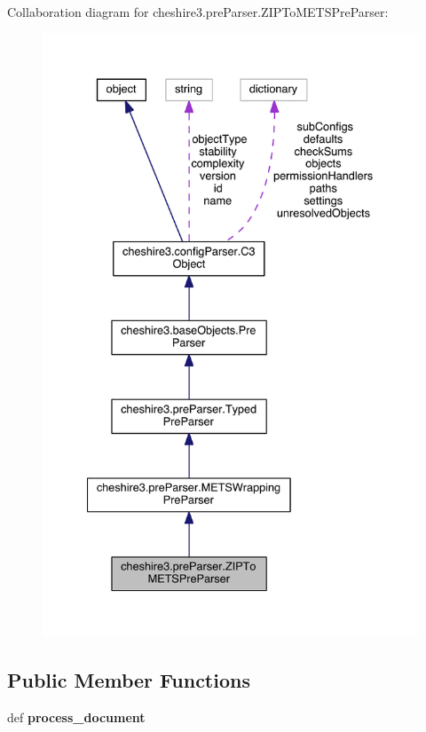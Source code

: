 Collaboration diagram for cheshire3.\-pre\-Parser.\-Z\-I\-P\-To\-M\-E\-T\-S\-Pre\-Parser\-:
\nopagebreak
\begin{figure}[H]
\begin{center}
\leavevmode
\includegraphics[width=334pt]{classcheshire3_1_1pre_parser_1_1_z_i_p_to_m_e_t_s_pre_parser__coll__graph}
\end{center}
\end{figure}
\subsection*{Public Member Functions}
\begin{DoxyCompactItemize}
\item 
\hypertarget{classcheshire3_1_1pre_parser_1_1_z_i_p_to_m_e_t_s_pre_parser_a8f5695bb2c237427eb437b085d6bb9f0}{def {\bfseries process\-\_\-document}}\label{classcheshire3_1_1pre_parser_1_1_z_i_p_to_m_e_t_s_pre_parser_a8f5695bb2c237427eb437b085d6bb9f0}

\end{DoxyCompactItemize}
